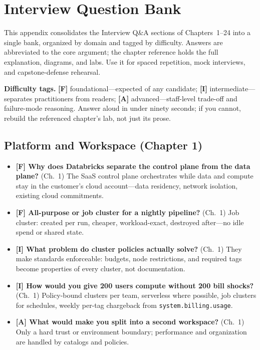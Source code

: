 \chapter{Interview Question Bank}
%
This appendix consolidates the Interview Q\&A sections of Chapters~1--24 into a single
bank, organized by domain and tagged by difficulty. Answers are abbreviated to the core
argument; the chapter reference holds the full explanation, diagrams, and labs. Use it for
spaced repetition, mock interviews, and capstone-defense rehearsal.

\begin{notebox}
\textbf{Difficulty tags.} \textbf{[F]} foundational---expected of any candidate;
\textbf{[I]} intermediate---separates practitioners from readers; \textbf{[A]}
advanced---staff-level trade-off and failure-mode reasoning. Answer aloud in under ninety
seconds; if you cannot, rebuild the referenced chapter's lab, not just its prose.
\end{notebox}

\section{Platform and Workspace (Chapter 1)}
%
\begin{itemize}
    \item \textbf{[F] Why does Databricks separate the control plane from the data plane?}
    (Ch.~1) The SaaS control plane orchestrates while data and compute stay in the customer's
    cloud account---data residency, network isolation, existing cloud commitments.
    \item \textbf{[F] All-purpose or job cluster for a nightly pipeline?} (Ch.~1) Job cluster:
    created per run, cheaper, workload-exact, destroyed after---no idle spend or shared state.
    \item \textbf{[I] What problem do cluster policies actually solve?} (Ch.~1) They make
    standards enforceable: budgets, node restrictions, and required tags become properties of
    every cluster, not documentation.
    \item \textbf{[I] How would you give 200 users compute without 200 bill shocks?} (Ch.~1)
    Policy-bound clusters per team, serverless where possible, job clusters for schedules,
    weekly per-tag chargeback from \texttt{system.billing.usage}.
    \item \textbf{[A] What would make you split into a second workspace?} (Ch.~1) Only a hard
    trust or environment boundary; performance and organization are handled by catalogs and
    policies.
\end{itemize}

